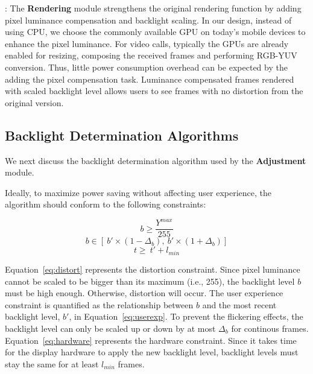 :
The {\bf Rendering} module strengthens the original rendering function by
adding pixel luminance compensation and backlight scaling.  In our design,
instead of using CPU, we choose the commonly available GPU on today's
mobile devices to enhance the pixel luminance.  For video calls,
typically the GPUs are already enabled for resizing, composing the received
frames and performing RGB-YUV conversion. Thus, little power consumption
overhead can be expected by the adding the pixel compensation task.
Luminance compensated frames rendered with scaled backlight level allows
users to see frames with no distortion from the original version.


\subsection{Backlight Determination Algorithms}
We next discuss the backlight
determination algorithm used by the {\bf Adjustment} module.
%

Ideally, to maximize power saving without affecting user experience, the algorithm should 
conform to the following constraints:

\begin{equation}
\label{eq:distort}
b \ge \frac{Y^{max}}{255}
\end{equation}
\begin{equation}
\label{eq:userexp}
b \in [\ b' \times ( 1 - \Delta_b ),\ b' \times ( 1 +
\Delta_b)]
\end{equation}
\begin{equation}
\label{eq:hardware}
t \ge \ t' + l_{min}
\end{equation}

Equation~\ref{eq:distort} represents the distortion constraint.
Since pixel luminance cannot be scaled to be bigger than its maximum (i.e., 255),
the backlight level $b$ must be high enough. Otherwise, distortion will occur. 
%
The user experience constraint is quantified as the relationship between
$b$ and the most recent backlight level, $b'$, in Equation~\ref{eq:userexp}. 
To prevent the flickering effects, the backlight level can only be scaled up or down
by at most $\Delta_b$ for continous frames. 
%
Equation~\ref{eq:hardware} represents the hardware constraint. 
Since it takes time for the display hardware to apply the new backlight level, 
backlight levels must stay the same for at least $l_{min}$ frames.

